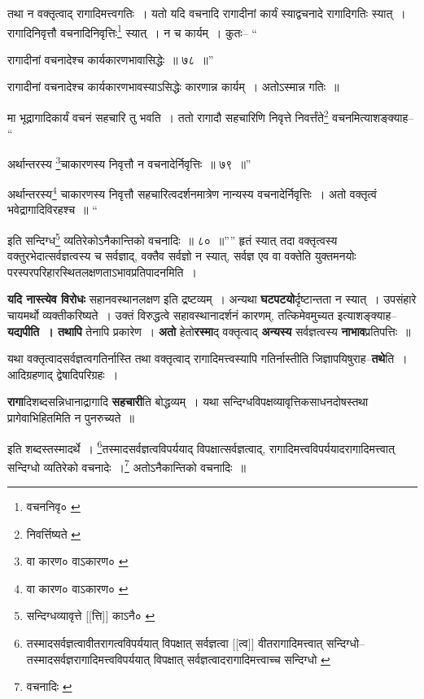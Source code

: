 \documentclass[article,12pt,a4paper]{memoir}
\begin{document}
	तथा न वक्तृत्वाद् रागादिमत्त्वगतिः । यतो यदि वचनादि रागादीनां कार्यं स्याद्वचनादे रागादिगतिः स्यात् । रागादिनिवृत्तौ वचनादिनिवृत्तिः\footnote{वचननिवृ० \cite{dp-msB} \cite{dp-msC} \cite{dp-msD}} स्यात् । न च कार्यम् । कुतः-- “
	  
	रागादीनां वचनादेश्च कार्यकारणभावासिद्धेः ॥ ७८ ॥” 
	  
	रागादीनां वचनादेश्च कार्यकारणभावस्याऽसिद्धेः कारणान्न कार्यम् । अतोऽस्मान्न गतिः ॥ 
	  
	मा भूद्रागादिकार्यं वचनं सहचारि तु भवति । ततो रागादौ सहचारिणि निवृत्ते निवर्त्तंते\footnote{निवर्त्तिष्यते \cite{dp-msC}} वचनमित्याशङ्क्याह-- “
	  
	अर्थान्तरस्य \footnote{वा कारण० \cite{dp-msA} \cite{dp-msB} \cite{dp-edP} \cite{dp-edH} \cite{dp-edE} वाऽकारण० \cite{dp-edN}}\-चाकारणस्य निवृत्तौ न वचनादेर्निवृत्तिः ॥ ७९ ॥” 
	  
	अर्थान्तरस्य\footnote{वा कारण० \cite{dp-msA} \cite{dp-msB} \cite{dp-edP} \cite{dp-edH} \cite{dp-edE} वाऽकारण० \cite{dp-edN}} चाकारणस्य निवृत्तौ सहचारित्वदर्शनमात्रेण नान्यस्य वचनादेर्निवृत्तिः । अतो वक्तृत्वं भवेद्रागादिविरहश्च ॥ “
	  
	इति सन्दिग्ध\footnote{सन्दिग्धव्यावृत्ते [[त्ति]] काऽनै० \cite{dp-msC}} व्यतिरेकोऽनैकान्तिको वचनादिः ॥ ८० ॥”” हृतं स्यात् तदा वक्तृत्वस्य वक्तुरभेदात्सर्वज्ञत्वस्य च सर्वज्ञाद्, वक्तैव सर्वज्ञो न स्यात्, सर्वज्ञ एव वा वक्तेति युक्तमनयोः परस्परपरिहारस्थितलक्षणताऽभावप्रतिपादनमिति ।
	\pend
      

	  \pstart \textbf{यदि नास्त्येव विरोधः} सहानवस्थानलक्षण इति द्रष्टव्यम् । अन्यथा \textbf{घटपटयो}र्दृष्टान्तता न स्यात् । उपसंहारे चायमर्थो व्यक्तीकरिष्यते । उक्तं विरुद्धत्वे सहावस्थानादर्शनं कारणम्, तत्किमेवमुच्यत इत्याशङ्क्याह--\textbf{यद्यपीति । तथापि} तेनापि प्रकारेण । \textbf{अतो} हेतो\textbf{रस्मा}द् वक्तृत्वाद् \textbf{अन्यस्य} सर्वज्ञत्वस्य \textbf{नाभाव}प्रतिपत्तिः ॥
	\pend
      

	  \pstart यथा वक्तृत्वादसर्वज्ञत्वगतिर्नास्ति तथा वक्तृत्वाद् रागादिमत्त्वस्यापि गतिर्नास्तीति जिज्ञापयिषुराह--\textbf{तथे}ति । आदिग्रहणाद् द्वेषादिपरिग्रहः ।
	\pend
      

	  \pstart \textbf{रागा}दिशब्दसन्निधानाद्रागादि \textbf{सहचारी}ति बोद्धव्यम् । यथा सन्दिग्धविपक्षव्यावृत्तिकसाधनदोषस्तथा प्रागेवाभिहितमिति न पुनरुच्यते ॥
	\pend
	  \bigskip
	  \begingroup
	

	  \pstart इति शब्दस्तस्मादर्थे । \footnote{तस्मादसर्वज्ञत्वावीतरागत्वविपर्ययात् विपक्षात् सर्वज्ञत्वा [[त्व]] वीतरागादिमत्त्वात् सन्दिग्धो--\cite{dp-msB} तस्मादसर्वज्ञरागादिमत्त्वविपर्ययात् विपक्षात् सर्वज्ञत्वादरागादिमत्त्वाच्च सन्दिग्धो \cite{dp-msC}}\-तस्मादसर्वज्ञत्वविपर्ययाद् विपक्षात्सर्वज्ञत्वाद्, रागादिमत्त्वविपर्ययादरागादिमत्त्वात् सन्दिग्धो व्यतिरेको वचनादेः ।\footnote{वचनादिः \cite{dp-msC}} अतोऽनैकान्तिको वचनादिः ॥
	\pend
       
\end{document}
